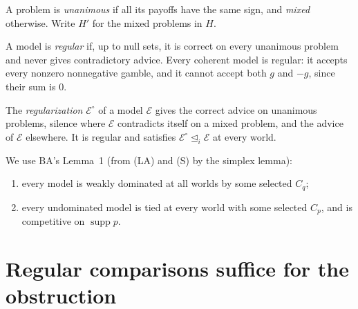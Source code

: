 \documentclass[11pt]{article}
\theoremstyle{remark}\newtheorem{remark}[theorem]{Remark}
\newcommand{\Escr}{\mathcal E}
\newcommand{\supp}{\operatorname{supp}}
\begin{document}
A problem is \emph{unanimous} if all its payoffs have the same sign, and
\emph{mixed} otherwise. Write $H'$ for the mixed problems in $H$.

A model is \emph{regular} if, up to null sets, it is correct on every
unanimous problem and never gives contradictory advice. Every coherent model
is regular: it accepts every nonzero nonnegative gamble, and it cannot accept
both $g$ and $-g$, since their sum is $0$.

The \emph{regularization} $\Escr^\circ$ of a model $\Escr$ gives the correct
advice on unanimous problems, silence where $\Escr$ contradicts itself on a
mixed problem, and the advice of $\Escr$ elsewhere. It is regular and
satisfies $\Escr^\circ\unlhd_i\Escr$ at every world.

We use BA's Lemma~1 (from (LA) and (S) by the simplex lemma):
\begin{enumerate}[label=(KKM\alph*),leftmargin=*]
\item every model is weakly dominated at all worlds by some selected $C_q$;
\item every undominated model is tied at every world with some selected
$C_p$, and is competitive on $\supp p$.
\end{enumerate}

\section{Regular comparisons suffice for the obstruction}
\end{document}

